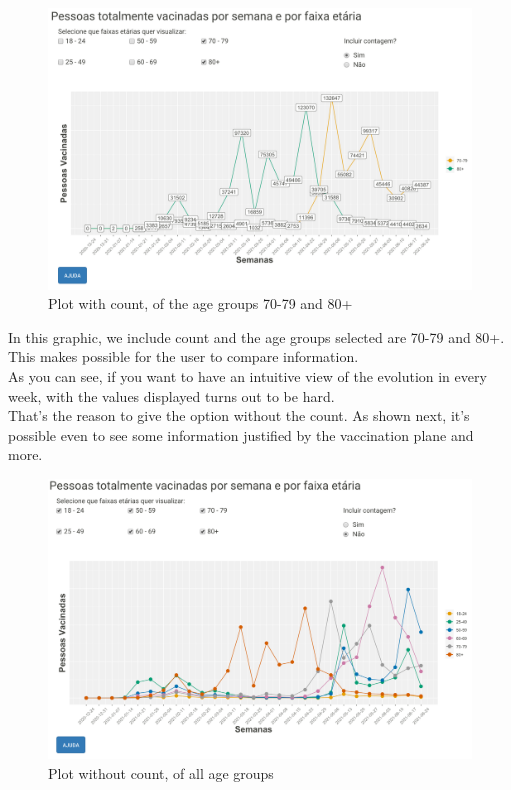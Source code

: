 \begin{figure}[H]
\centering
\includegraphics[width=350pt,trim=10 0 0 -10mm]{images/p2.png}
\caption{Plot with count, of the age groups 70-79 and 80+}
\label{fig:ages-vac-1}
\end{figure}
In this graphic, we include count and the age groups selected are 70-79 and 80+. This makes possible for the user to compare information.\\
As you can see, if you want to have an intuitive view of the evolution in every week, with the values displayed turns out to be hard.\\
That's the reason to give the option without the count. As shown next, it's possible even to see some information justified by the vaccination plane and more. 

\begin{figure}[H]
\centering
\includegraphics[width=350pt,trim=10 0 0 -10mm]{images/p4.png}
\caption{Plot without count, of all age groups}
\label{fig:ages-vac-1}
\end{figure}

